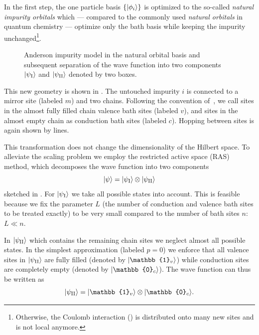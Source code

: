 In the first step,
the one particle basis $\{\lvert\phi_i\rangle\}$ is optimized to the so-called
\emph{natural impurity orbitals} which
--- compared to the commonly used \emph{natural orbitals} in quantum chemistry ---
optimize only the bath basis while keeping the impurity unchanged\footnote{
    Otherwise,
    the Coulomb interaction ()
    is distributed onto many new sites and is not local anymore.
}.
\begin{figure}[ht]
    \centering
    
    \caption{
        Anderson impurity model in the natural orbital basis and
        subsequent separation of the wave function into two components
        $\lvert\psi_{\mathrm{I}}\rangle$ and $\lvert\psi_{\mathrm{II}}\rangle$ denoted by two boxes.
    }%
    \label{fig:AIM-natural-impurity-orbitals}
\end{figure}
This new geometry is shown in .
The untouched impurity $i$ is connected to a mirror site (labeled $m$) and two chains.
Following the convention of~\cite{Lu2014,Lu2019},
we call sites in the almost fully filled chain valence bath sites (labeled $v$),
and sites in the almost empty chain as conduction bath sites (labeled $c$).
Hopping between sites is again shown by lines.

This transformation does not change the dimensionality of the Hilbert space.
To alleviate the scaling problem we employ the restricted active space (RAS) method,
which decomposes the wave function into two components
\begin{equation}
    \lvert\psi\rangle = \lvert\psi_{\mathrm{I}}\rangle \otimes \lvert\psi_{\mathrm{II}}\rangle
\end{equation}
sketched in .
For $\lvert\psi_{\mathrm{I}}\rangle$ we take all possible states into account.
This is feasible because we fix the parameter $L$
(the number of conduction and valence bath sites to be treated exactly)
to be very small compared to the number of bath sites $n$: $L \ll n$.

In $\lvert\psi_{\mathrm{II}}\rangle$ which contains the remaining chain sites we neglect almost all
possible states.
In the simplest approximation (labeled $p=0$)
we enforce that all valence sites in $\lvert\psi_{\mathrm{II}}\rangle$
are fully filled (denoted by $\ket{\mathbb{1}_v}$) while
conduction sites are completely empty (denoted by $\ket{\mathbb{0}_c}$).
The wave function can thus be written as
\begin{equation}
    \ket{\psi_\mII} = \ket{\mathbb{1}_v} \otimes \ket{\mathbb{0}_c}.
\end{equation}

